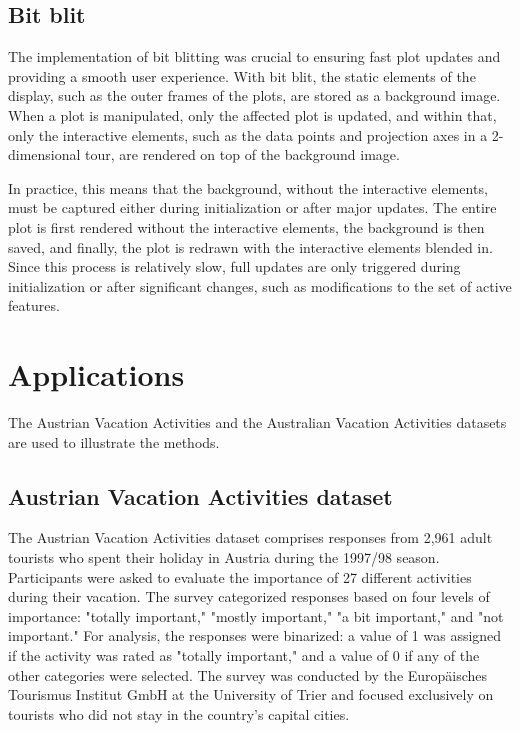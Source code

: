 \documentclass[article]{ajs}
\begin{document}
\subsection{Bit blit}

The implementation of bit blitting was crucial to ensuring fast plot updates and providing a smooth user experience. With bit blit, the static elements of the display, such as the outer frames of the plots, are stored as a background image. When a plot is manipulated, only the affected plot is updated, and within that, only the interactive elements, such as the data points and projection axes in a 2-dimensional tour, are rendered on top of the background image.

In practice, this means that the background, without the interactive elements, must be captured either during initialization or after major updates. The entire plot is first rendered without the interactive elements, the background is then saved, and finally, the plot is redrawn with the interactive elements blended in. Since this process is relatively slow, full updates are only triggered during initialization or after significant changes, such as modifications to the set of active features.


\section{Applications}

The Austrian Vacation Activities \cite{dolnicar2003winter} and the Australian Vacation Activities \cite{cliff2009formative} datasets are used to illustrate the methods.

\subsection{Austrian Vacation Activities dataset}

The Austrian Vacation Activities dataset comprises responses from 2,961 adult tourists who spent their holiday in Austria during the 1997/98 season. Participants were asked to evaluate the importance of 27 different activities during their vacation. The survey categorized responses based on four levels of importance: "totally important," "mostly important," "a bit important," and "not important." For analysis, the responses were binarized: a value of 1 was assigned if the activity was rated as "totally important," and a value of 0 if any of the other categories were selected. The survey was conducted by the Europäisches Tourismus Institut GmbH at the University of Trier and focused exclusively on tourists who did not stay in the country's capital cities.
\end{document}
